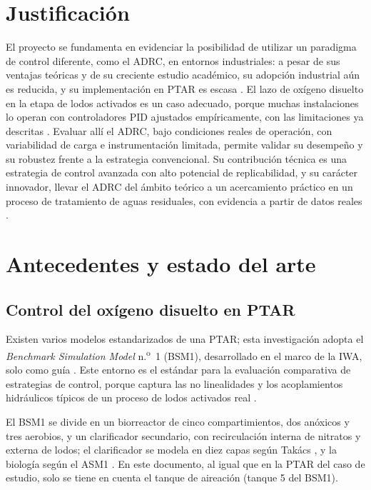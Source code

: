 \section{Justificación}
\label{sec:justificacion}

El proyecto se fundamenta en evidenciar la posibilidad de utilizar un paradigma de control diferente,
como el ADRC, en entornos industriales: a pesar de sus ventajas teóricas y de su creciente estudio
académico, su adopción industrial aún es reducida, y su implementación en PTAR es escasa
\cite{Wei2020b,wei2022scalable,Sangregorio2023}. El lazo de oxígeno disuelto en la etapa de lodos
activados es un caso adecuado, porque muchas instalaciones lo operan con controladores PID ajustados
empíricamente, con las limitaciones ya descritas \cite{khalid2018review,shen2009mpc,qiao2018adaptive}.
Evaluar allí el ADRC, bajo condiciones reales de operación, con variabilidad de carga e instrumentación
limitada, permite validar su desempeño y su robustez frente a la estrategia convencional. Su
contribución técnica es una estrategia de control avanzada con alto potencial de replicabilidad, y su
carácter innovador, llevar el ADRC del ámbito teórico a un acercamiento práctico en un proceso de
tratamiento de aguas residuales, con evidencia a partir de datos reales
\cite{amand2013review,santin2016advanced}.

\section{Antecedentes y estado del arte}
\label{sec:estado_arte}

\subsection{Control del oxígeno disuelto en PTAR}
\label{subsec:intro_od}

Existen varios modelos estandarizados de una PTAR; esta investigación adopta
el \textit{Benchmark Simulation Model} n.\textsuperscript{o}~1 (BSM1),
desarrollado en el marco de la IWA, solo como guía
\cite{copp2002bsm1,alex2008bsm1}. Este entorno es el estándar para la
evaluación comparativa de estrategias de control, porque captura las no
linealidades y los acoplamientos hidráulicos típicos de un proceso de lodos
activados real \cite{wei2020disturbance}.

El BSM1 se divide en un biorreactor de cinco compartimientos, dos anóxicos y tres aerobios, y un
clarificador secundario, con recirculación interna de nitratos y externa de lodos; el clarificador se
modela en diez capas según Takács \cite{takacs1991settler}, y la biología según el ASM1
\cite{henze1987asm1}. En este documento, al igual que en la PTAR del caso de estudio, solo se tiene en
cuenta el tanque de aireación (tanque 5 del BSM1).

